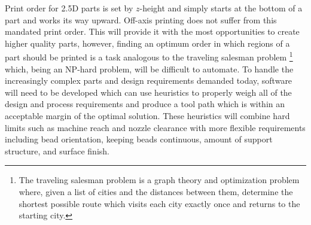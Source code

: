 \documentclass[main.tex]{subfiles}
\begin{document}
Print order for 2.5D parts is set by $z$\nobreakdash-height and simply starts at the bottom of a part and works its way upward.
Off-axis printing does not suffer from this mandated print order.
This will provide it with the most opportunities to create higher quality parts, however, finding an optimum order in which regions of a part should be printed is a task analogous to the traveling salesman problem%
\footnote{The traveling salesman problem is a graph theory and optimization problem where, given a list of cities and the distances between them, determine the shortest possible route which visits each city exactly once and returns to the starting city.}
which, being an NP-hard problem, will be difficult to automate.
To handle the increasingly complex parts and design requirements demanded today, software will need to be developed which can use heuristics to properly weigh all of the design and process requirements and produce a tool path which is within an acceptable margin of the optimal solution.
These heuristics will combine hard limits such as machine reach and nozzle clearance with more flexible requirements including bead orientation, keeping beads continuous, amount of support structure, and surface finish.
\end{document}
